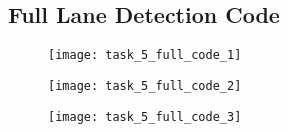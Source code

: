 \documentclass[conference]{IEEEtran}
\begin{document}
\begin{appendix}
\subsection{Full Lane Detection Code} \label{appendix:task_5_lane_code}

\begin{figure}[H]
\centerline{\texttt{[image: task\_5\_full\_code\_1]}}
\end{figure}

\begin{figure}[H]
\centerline{\texttt{[image: task\_5\_full\_code\_2]}}
\end{figure}

\begin{figure}[H]
\centerline{\texttt{[image: task\_5\_full\_code\_3]}}
\end{figure}

\end{appendix}
\end{document}
